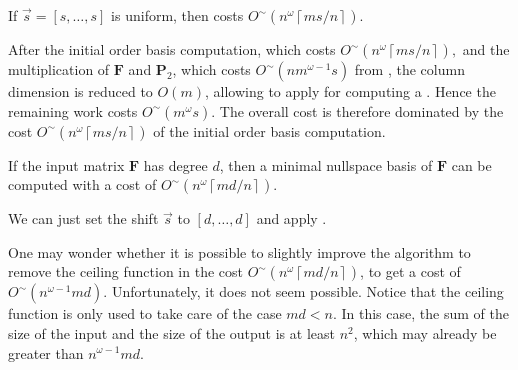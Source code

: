 \begin{lem}
\label{lem:costOfMinimalNullspaceBasisWithUniformShift}If $\vec{s}=\left[s,\dots,s\right]$
is uniform, then  costs $O^{\sim}\left(n^{\omega}\left\lceil ms/n\right\rceil \right)$. \end{lem}
\begin{pf}
After the initial order basis computation, which costs $O^{\sim}\left(n^{\omega}\left\lceil ms/n\right\rceil \right),$
and the multiplication of $\mathbf{F}$ and $\mathbf{P}_{2}$, which
costs $O^{\sim}\left(nm^{\omega-1}s\right)$ from ,
the column dimension is reduced to $O\left(m\right)$, allowing 
to apply for computing a . Hence the remaining work costs $O^{\sim}\left(m^{\omega}s\right)$.
The overall cost is therefore dominated by the cost $O^{\sim}\left(n^{\omega}\left\lceil ms/n\right\rceil \right)$
of the initial order basis computation.\end{pf}
\begin{thm}
\label{cor:costOfMinimalNullspaceBasis}If the input matrix $\mathbf{F}$
has degree $d$, then a minimal nullspace basis of $\mathbf{F}$ can
be computed with a cost of $O^{\sim}\left(n^{\omega}\left\lceil md/n\right\rceil \right)$. \end{thm}
\begin{pf}
We can just set the shift $\vec{s}$ to $\left[d,\dots,d\right]$
and apply .\end{pf}
\begin{rem}
One may wonder whether it is possible to slightly improve the algorithm
to remove the ceiling function in the cost $O^{\sim}\left(n^{\omega}\left\lceil md/n\right\rceil \right)$,
to get a cost of $O^{\sim}\left(n^{\omega-1}md\right)$. Unfortunately,
it does not seem possible. Notice that the ceiling function is only
used to take care of the case $md<n$. In this case, the sum of the
size of the input and the size of the output is at least $n^{2}$,
which may already be greater than $n^{\omega-1}md$.\end{rem}

